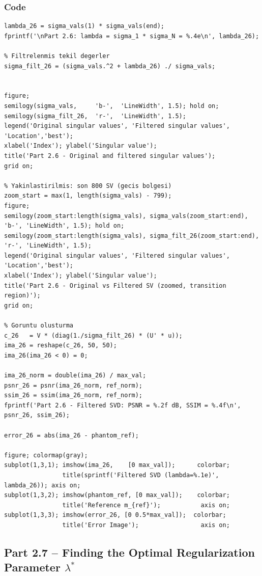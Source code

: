 \documentclass[12pt,a4paper]{article}
\begin{document}
\subsubsection*{Code}
\begin{lstlisting}
lambda_26 = sigma_vals(1) * sigma_vals(end);
fprintf('\nPart 2.6: lambda = sigma_1 * sigma_N = %.4e\n', lambda_26);

% Filtrelenmis tekil degerler
sigma_filt_26 = (sigma_vals.^2 + lambda_26) ./ sigma_vals;


figure;
semilogy(sigma_vals,     'b-',  'LineWidth', 1.5); hold on;
semilogy(sigma_filt_26,  'r-',  'LineWidth', 1.5);
legend('Original singular values', 'Filtered singular values', 'Location','best');
xlabel('Index'); ylabel('Singular value');
title('Part 2.6 - Original and filtered singular values');
grid on;

% Yakinlastirilmis: son 800 SV (gecis bolgesi)
zoom_start = max(1, length(sigma_vals) - 799);
figure;
semilogy(zoom_start:length(sigma_vals), sigma_vals(zoom_start:end), 'b-', 'LineWidth', 1.5); hold on;
semilogy(zoom_start:length(sigma_vals), sigma_filt_26(zoom_start:end), 'r-', 'LineWidth', 1.5);
legend('Original singular values', 'Filtered singular values', 'Location','best');
xlabel('Index'); ylabel('Singular value');
title('Part 2.6 - Original vs Filtered SV (zoomed, transition region)');
grid on;

% Goruntu olusturma
c_26   = V * (diag(1./sigma_filt_26) * (U' * u));
ima_26 = reshape(c_26, 50, 50);
ima_26(ima_26 < 0) = 0;

ima_26_norm = double(ima_26) / max_val;
psnr_26 = psnr(ima_26_norm, ref_norm);
ssim_26 = ssim(ima_26_norm, ref_norm);
fprintf('Part 2.6 - Filtered SVD: PSNR = %.2f dB, SSIM = %.4f\n', psnr_26, ssim_26);

error_26 = abs(ima_26 - phantom_ref);

figure; colormap(gray);
subplot(1,3,1); imshow(ima_26,    [0 max_val]);      colorbar;
                title(sprintf('Filtered SVD (lambda=%.1e)', lambda_26)); axis on;
subplot(1,3,2); imshow(phantom_ref, [0 max_val]);    colorbar;
                title('Reference m_{ref}');           axis on;
subplot(1,3,3); imshow(error_26, [0 0.5*max_val]);  colorbar;
                title('Error Image');                 axis on;
\end{lstlisting}

\subsection{Part 2.7 -- Finding the Optimal Regularization Parameter $\lambda^*$}
\end{document}
